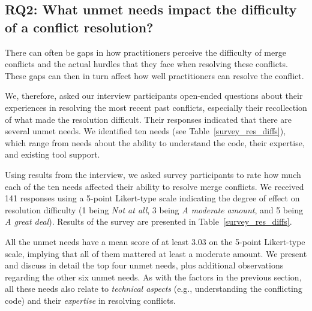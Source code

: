 \subsection{\textbf{RQ2:} What unmet needs impact the difficulty of a conflict resolution?}\label{RQ2}

There can often be gaps in how practitioners perceive the difficulty of merge conflicts and the actual hurdles that they face when resolving these conflicts. 
These gaps can then in turn affect how well practitioners can resolve the conflict.

We, therefore, asked our interview participants open-ended questions about their experiences in resolving the most recent past conflicts, especially their recollection of what made the resolution difficult.
Their responses indicated that there are several unmet needs. We identified ten needs (see Table~\ref{survey_res_diffs}), which range from needs about the ability to understand the code, their expertise, and existing tool support.  

Using results from the interview, we asked survey participants to rate how much each of the ten needs affected their ability to resolve merge conflicts.
We received 141 responses using a 5-point Likert-type scale indicating the degree of effect on resolution difficulty (1 being \textit{Not at all}, 3 being \textit{A moderate amount}, and 5 being \textit{A great deal}).
Results of the survey are presented in Table~\ref{survey_res_diffs}. 

All the unmet needs have a mean score of at least $3.03$ on the 5-point Likert-type scale, implying that all of them mattered at least a moderate amount.
We present and discuss in detail the top four unmet needs, plus additional observations regarding the other six unmet needs. 
As with the factors in the previous section, all these needs also relate to \textit{technical aspects} (e.g., understanding the conflicting code) and their \textit{expertise} in resolving conflicts.


